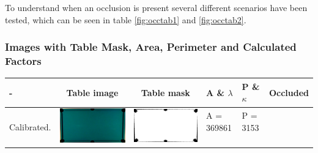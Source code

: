 To understand when an occlusion is present several different scenarios have been tested, which can be seen in table \ref{fig:occtab1} and  \ref{fig:occtab2}.

\subsubsection{Images with Table Mask, Area, Perimeter and Calculated Factors}
\begin{table}[H]
\begin{tabular}{|l|c|c|l|l|c|}

\hline - & Table image & Table mask & A \& $\lambda$ & P \& $\kappa$ & Occluded \\ 
\hline

\multirow{4}{*}{Calibrated.} & \multirow{4}{*}{\includegraphics[scale=0.08]{../images/1/calibimg.png}} & \multirow{4}{*}{\includegraphics[scale=0.08]{../images/1/calibmask.png}} & A = 369861 & P = 3153  & \multirow{4}{*}{}\\  
& & & & & \\
&&&&&\\
&&&&&\\
\hline


\end{tabular}
\end{table}
